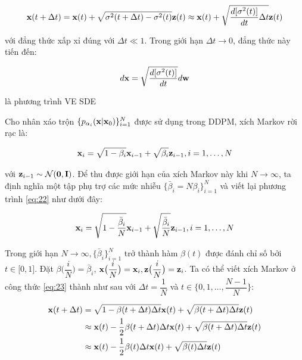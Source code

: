 \documentclass{article} %
\begin{document}
\begin{equation*}
    \bold{x}(t + \Delta t) = \bold{x}(t) + \sqrt{\sigma^2 (t + \Delta t) - \sigma^2 (t)} \bold{z}(t) \approx \bold{x} (t) + \sqrt{\dfrac{d \lbrack \sigma^2 (t) \rbrack}{dt}\Delta t} \bold{z}(t)
\end{equation*}

với đẳng thức xấp xỉ đúng với $\Delta t \ll 1$.
Trong giới hạn $\Delta t \rightarrow 0$, đẳng thức này tiến đến:

\begin{equation} \label{eq:21}
    d \bold{x} = \sqrt{\dfrac{d \lbrack \sigma^2(t) \rbrack}{dt}} d \bold{w}
\end{equation}

là phương trình VE SDE

Cho nhân xáo trộn $\lbrace p_{\alpha_i} (\bold{x} \vert \bold{x}_0) \rbrace_{i=1}^N$ được sử dụng trong DDPM, xích Markov rời rạc là:

\begin{equation} \label{eq:22}
    \bold{x}_i = \sqrt{1 - \beta_i} \bold{x}_{i-1} + \sqrt{\beta_i} \bold{z}_{i-1}, i = 1, \dots, N
\end{equation}

với $\bold{z}_{i-1} \sim \mathcal{N}(\bold{0}, \bold{I})$.
Để thu được giới hạn của xích Markov này khi $N \rightarrow \infty$, ta định nghĩa một tập phụ trợ các mức nhiễu $\lbrace \bar{\beta}_i = N \beta_i \rbrace_{i=1}^N$ và viết lại phương trình \ref{eq:22} như dưới đây:

\begin{equation} \label{eq:23}
    \bold{x}_i = \sqrt{1 - \dfrac{\bar{\beta}_i}{N}} \bold{x}_{i-1} + \sqrt{\dfrac{\bar{\beta}_i}{N}} \bold{z}_{i-1}, i = 1, \dots, N
\end{equation}

Trong giới hạn $N \rightarrow \infty, \lbrace \bar{\beta}_i \rbrace_{i=1}^N$ trở thành hàm $\beta(t)$ được đánh chỉ số bởi $t \in \lbrack 0, 1 \rbrack$.
Đặt $\beta \big ( \dfrac{i}{N} \big) = \bar{\beta}_i$,
$\bold{x}\big( \dfrac{i}{N} \big) = \bold{x}_i, \bold{z}\big( \dfrac{i}{N} \big) = \bold{z}_i$.
Ta có thể viết xích Markov ở công thức \ref{eq:23} thành như sau với $\Delta t = \dfrac{1}{N}$ và $t \in \lbrace 0, 1, \dots, \dfrac{N-1}{N} \rbrace$:

\begin{equation} \label{eq:24}
    \begin{aligned}
        \bold{x}(t + \Delta t) &= \sqrt{1 - \beta(t + \Delta t) \Delta t} \bold{x}(t) + \sqrt{\beta(t + \Delta t) \Delta t} \bold{z}(t) \\
        &\approx \bold{x}(t) - \dfrac{1}{2}\beta(t + \Delta t) \Delta t \bold{x} (t) + \sqrt{\beta(t + \Delta t) \Delta t} \bold{z} (t) \\
        &\approx \bold{x}(t) - \dfrac{1}{2} \beta(t) \Delta t \bold{x} (t) + \sqrt{\beta(t) \Delta t} \bold{z} (t)
    \end{aligned}
\end{equation}
\end{document}
